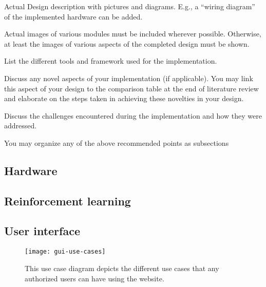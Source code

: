 \documentclass[../main.tex]{subfiles}
\begin{document}
\begin{newrequirements}
    \begin{todolist}
    \item[\done] Actual Design description with pictures 
        and diagrams. E.g., a “wiring diagram” 
        of the implemented hardware can be 
        added. 

    \item[\done] Actual images of various modules must 
        be included wherever possible. 
        Otherwise, at least the images of 
        various aspects of the completed design 
        must be shown. 

    \item[\done] List the different tools and framework 
        used for the implementation. 

    \item[\done] Discuss any novel aspects of your 
        implementation (if applicable). You may 
        link this aspect of your design to the 
        comparison table at the end of 
        literature review and elaborate on the 
        steps taken in achieving these 
        novelties in your design. 

    \item [\done] Discuss the challenges encountered 
        during the implementation and how they 
        were addressed. 

    \item [\done] You may organize any of the above 
        recommended points as subsections 

    \end{todolist}
\end{newrequirements}

\subsection{Hardware}

\lipsum[1]

\subsection{Reinforcement learning}

\lipsum[1]

\subsection{User interface}

\begin{figure}[tbp] 
	\centering
	\texttt{[image: gui-use-cases]} 
	\caption{This use case diagram depicts the different use cases that any authorized users can have using the website.}
	\label{fig:gui-use-cases} 
\end{figure}
\end{document}
